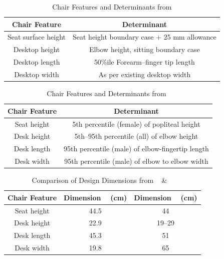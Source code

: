 \documentclass[conference]{IEEEtran}
\begin{document}
\begin{table}[htbp]
    \caption{Chair Features and Determinants from\cite{mohamed}}
    \begin{center}
    \begin{tabular}{c c}
    \toprule
    \textbf{Chair Feature} & \textbf{Determinant} \\
    \midrule
    Seat surface height & Seat height boundary case + 25 mm allowance \\
    \midrule
    Desktop height & Elbow height, sitting boundary case \\
    \midrule
    Desktop length & 50\%ile Forearm--finger tip length \\
    \midrule
    Desktop width & As per existing desktop width \\
    \bottomrule
    \end{tabular}
    \label{tab:determinants1}
    \end{center}
\end{table}

\begin{table}[htbp]
    \caption{Chair Features and Determinants from~\cite{Ansari}}
    \begin{center}
    \begin{tabular}{c c}
    \toprule
    \textbf{Chair Feature} & \textbf{Determinant} \\
    \midrule
    Seat height & 5th percentile (female) of popliteal height \\
    \midrule
    Desk height & 5th--95th percentile (all) of elbow height \\
    \midrule
    Desk length & 95th percentile (male) of elbow-fingertip length \\
    \midrule
    Desk width & 95th percentile (male) of elbow to elbow width \\
    \bottomrule
    \end{tabular}
    \label{tab:determinants2}
    \end{center}
\end{table}
    
\begin{table}[htbp]
    \caption{Comparison of Design Dimensions from ~\cite{mohamed} \& ~\cite{Ansari}}
    \begin{center}
    \begin{tabular}{c c c}
    \toprule
    \textbf{Chair Feature} & \textbf{Dimension ~\cite{mohamed} (cm)} & \textbf{Dimension ~\cite{Ansari} (cm)} \\
    \midrule
    Seat height & 44.5 & 44 \\
    \midrule
    Desk height & 22.9 & 19--29 \\
    \midrule
    Desk length & 45.3 & 51 \\
    \midrule
    Desk width & 19.8 & 65 \\
    \bottomrule
    \end{tabular}
    \label{tab:dimension_comparison}
    \end{center}
\end{table}
\end{document}
